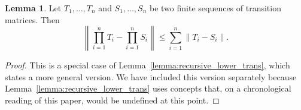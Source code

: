 \documentclass[10pt,a4paper]{paper}
\theoremstyle{definition}
\newtheorem{lemma}[theorem]{Lemma}
\newcommand{\norm}[1]{\left\lVert #1 \right\rVert}
\begin{document}
\begin{lemma}\label{lemma:recursive}
Let $T_1,\ldots,T_n$ and $S_1,\ldots,S_n$ be two finite sequences of transition matrices. Then
\begin{equation*}
\norm{\prod_{i=1}^nT_i - \prod_{i=1}^nS_i} \leq \sum_{i=1}^n \norm{T_i - S_i}.
\end{equation*}
\end{lemma}
\begin{proof}
This is a special case of Lemma~\ref{lemma:recursive_lower_trans}, which states a more general version. We have included this version separately because Lemma~\ref{lemma:recursive_lower_trans} uses concepts that, on a chronological reading of this paper, would be undefined at this point.
\end{proof}
\end{document}

